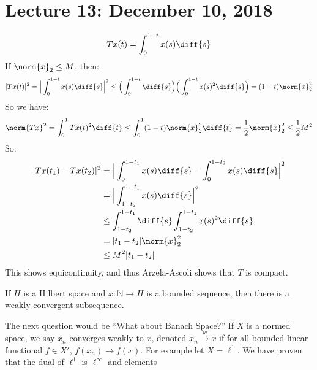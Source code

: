     \section{Lecture 13: December 10, 2018}
        \begin{equation}
            Tx(t)=\int_{0}^{1-t}x(s)\diff{s}
        \end{equation}
        If $\norm{x}_{2}\leq{M}$, then:
        \begin{equation}
            |Tx(t)|^{2}=
            \Big|\int_{0}^{1-t}x(s)\diff{s}\Big|^{2}
            \leq\Big(\int_{0}^{1-t}\diff{s}\Big)
            \Big(\int_{0}^{1-t}x(s)^{2}\diff{s}\Big)
            =(1-t)\norm{x}_{2}^{2}
        \end{equation}
        So we have:
        \begin{equation}
            \norm{Tx}^{2}=\int_{0}^{1}Tx(t)^{2}\diff{t}
            \leq\int_{0}^{1}(1-t)\norm{x}_{2}^{2}\diff{t}
            =\frac{1}{2}\norm{x}_{2}^{2}
            \leq\frac{1}{2}M^{2}
        \end{equation}
        So:
        \begin{align}
            |Tx(t_{1})-Tx(t_{2})|^{2}
            &=\Big|\int_{0}^{1-t_{1}}x(s)\diff{s}-
            \int_{0}^{1-t_{2}}x(s)\diff{s}\Big|^{2}\\
            &=\Big|\int_{1-t_{2}}^{1-t_{1}}x(s)
            \diff{s}\Big|^{2}\\
            &\leq\int_{1-t_{2}}^{1-t_{1}}\diff{s}
            \int_{1-t_{2}}^{1-t_{1}}x(s)^{2}\diff{s}\\
            &=|t_{1}-t_{2}|\norm{x}_{2}^{2}\\
            &\leq{M}^{2}|t_{1}-t_{2}|
        \end{align}
        This shows equicontinuity, and thus Arzela-Ascoli
        shows that $T$ is compact.
        \begin{theorem}
            If $H$ is a Hilbert space and
            $x:\mathbb{N}\rightarrow{H}$ is a bounded sequence,
            then there is a weakly convergent subsequence.
        \end{theorem}
        The next question would be ``What about Banach Space?''
        If $X$ is a normed space, we say $x_{n}$ converges
        weakly to $x$, denoted
        $x_{n}\overset{w}{\rightarrow}{x}$ if for all
        bounded linear functional $f\in{X'}$,
        $f(x_{n})\rightarrow{f(x)}$.
        For example let $X=\ell^{1}$. We have proven that the
        dual of $\ell^{1}$ is $\ell^{\infty}$ and elements
